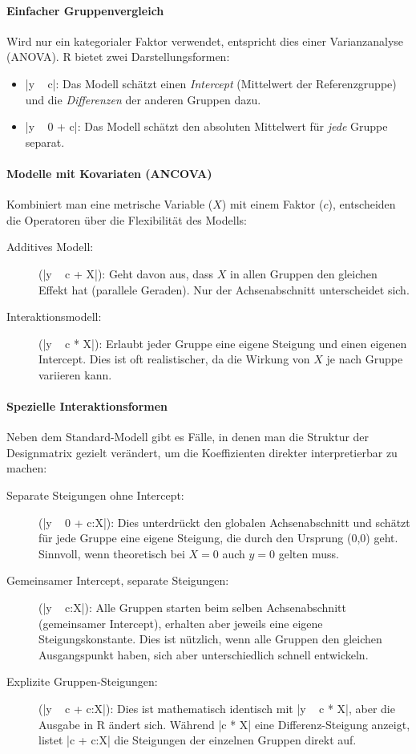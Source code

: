 \documentclass[10pt,twocolumn]{scrartcl}
\renewcommand{\lstinline}{\mycoloredinline}
\begin{document}
\paragraph{Einfacher Gruppenvergleich}
Wird nur ein kategorialer Faktor verwendet, entspricht dies einer Varianzanalyse (ANOVA). R bietet zwei Darstellungsformen:
\begin{itemize}
\item \lstinline|y ~ c|: Das Modell schätzt einen \emph{Intercept} (Mittelwert der Referenzgruppe) und die \emph{Differenzen} der anderen Gruppen dazu.
\item \lstinline|y ~ 0 + c|: Das Modell schätzt den absoluten Mittelwert für \emph{jede} Gruppe separat.
\end{itemize}

\paragraph{Modelle mit Kovariaten (ANCOVA)}
Kombiniert man eine metrische Variable ($X$) mit einem Faktor ($c$), entscheiden die Operatoren über die Flexibilität des Modells:
\begin{description}
\item[Additives Modell:] (\lstinline|y ~ c + X|): Geht davon aus, dass $X$ in allen Gruppen den gleichen Effekt hat (parallele Geraden). Nur der Achsenabschnitt unterscheidet sich.
\item[Interaktionsmodell:] (\lstinline|y ~ c * X|): Erlaubt jeder Gruppe eine eigene Steigung und einen eigenen Intercept. Dies ist oft realistischer, da die Wirkung von $X$ je nach Gruppe variieren kann.
\end{description}

\paragraph{Spezielle Interaktionsformen}
Neben dem Standard-Modell gibt es Fälle, in denen man die Struktur der Designmatrix gezielt verändert, um die Koeffizienten direkter interpretierbar zu machen:
\begin{description}
\item[Separate Steigungen ohne Intercept:] (\lstinline|y ~ 0 + c:X|):
Dies unterdrückt den globalen Achsenabschnitt und schätzt für jede Gruppe eine eigene Steigung, die durch den Ursprung (0,0) geht. Sinnvoll, wenn theoretisch bei $X=0$ auch $y=0$ gelten muss.
\item[Gemeinsamer Intercept, separate Steigungen:] (\lstinline|y ~ c:X|):
Alle Gruppen starten beim selben Achsenabschnitt (gemeinsamer Intercept), erhalten aber jeweils eine eigene Steigungskonstante. Dies ist nützlich, wenn alle Gruppen den gleichen Ausgangspunkt haben, sich aber unterschiedlich schnell entwickeln.
\item[Explizite Gruppen-Steigungen:] (\lstinline|y ~ c + c:X|):
Dies ist mathematisch identisch mit \lstinline|y ~ c * X|, aber die Ausgabe in R ändert sich. Während \lstinline|c * X| eine Differenz-Steigung anzeigt, listet \lstinline|c + c:X| die Steigungen der einzelnen Gruppen direkt auf.
\end{description}
\end{document}
